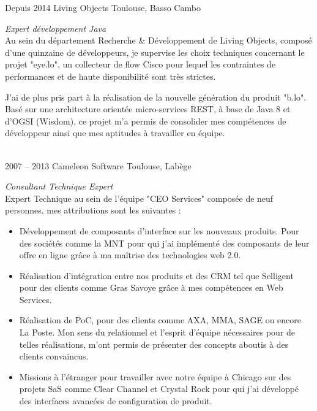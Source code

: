 \documentclass{friggeri-cv} 	%
\begin{document}
\begin{entrylist}
\entry
{Depuis 2014}
{Living Objects}
{Toulouse, Basso Cambo}
{\vspace{0.2cm}\emph{Expert développement Java} \\
Au sein du département Recherche \& Développement de Living Objects, composé d'une quinzaine de développeurs, je supervise les choix techniques concernant le projet "eye.lo", un collecteur de flow Cisco pour lequel les contraintes de performances et de haute disponibilité sont très strictes.

J'ai de plus pris part à la réalisation de la nouvelle génération du produit "b.lo". Basé sur une architecture orientée micro-services REST, à base de Java 8 et d'OGSI (Wisdom), ce projet m'a permis de consolider mes compétences de développeur ainsi que mes aptitudes à travailler en équipe.
}\\

\entry
{2007 -- 2013}
{Cameleon Software}
{Toulouse, Labège}
{\vspace{0.2cm}\emph{Consultant Technique Expert} \\
Expert Technique au sein de l'équipe "CEO Services" composée de neuf personnes, mes attributions sont les suivantes :
\begin{itemize}
\item Développement de composants d’interface sur les nouveaux produits. Pour des sociétés
comme la MNT pour qui j’ai implémenté des composants de leur offre en ligne grâce à ma
maîtrise des technologies web 2.0.
\item Réalisation d’intégration entre nos produits et des CRM tel que Selligent pour des clients
comme Gras Savoye grâce à mes compétences en Web Services.
\item Réalisation de PoC, pour des clients comme AXA, MMA, SAGE ou encore La Poste. Mon sens
du relationnel et l'esprit d'équipe nécessaires pour de telles réalisations, m'ont permis de
présenter des concepts aboutis à des clients convaincus.
\item Missions à l’étranger pour travailler avec notre équipe à Chicago sur des projets SaS comme
Clear Channel et Crystal Rock pour qui j'ai développé des interfaces avancées de
configuration de produit.
\end{itemize}
}\\


\end{entrylist}
\end{document}
